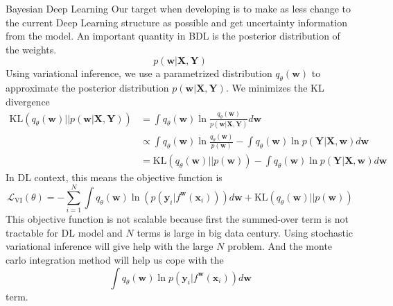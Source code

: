 \documentclass{beamer}
\begin{document}
\begin{frame}[allowframebreaks]{Bayesian Deep Learning}
Our target when developing is to make as less change to the current Deep Learning structure as possible and get uncertainty information from the model.
An important quantity in BDL is the posterior distribution of the weights.
$$p(\mathbf{w} | \mathbf{X}, \mathbf{Y})$$
Using variational inference, we use a parametrized distribution $q_\theta(\mathbf{w})$ to approximate the posterior distribution $p(\mathbf{w} | \mathbf{X}, \mathbf{Y})$.
We minimizes the KL divergence
\begin{align*}
\text{KL}(q_\theta(\mathbf{w}) || p(\mathbf{w} | \mathbf{X}, \mathbf{Y})) & = \int q_\theta(\mathbf{w}) \ln \frac{ q_\theta(\mathbf{w})}{p(\mathbf{w} | \mathbf{X}, \mathbf{Y})} d\mathbf{w} \\ 
& \propto \int q_\theta(\mathbf{w}) \ln \frac{ q_\theta(\mathbf{w})}{p(\mathbf{w})} - \int q_\theta(\mathbf{w}) \ln p(\mathbf{Y} | \mathbf{X}, \mathbf{w}) d\mathbf{w} \\ 
& = \text{KL}(q_\theta(\mathbf{w}) || p(\mathbf{w})) - \int q_\theta(\mathbf{w}) \ln p(\mathbf{Y} | \mathbf{X}, \mathbf{w}) d \mathbf{w}
\end{align*}
In DL context, this means the objective function is
$$\mathcal{L}_{\text{VI}} (\theta) = - \sum_{i=1}^N \int q_\theta(\mathbf{w}) \ln (p(\mathbf{y}_i | f^\mathbf{w} (\mathbf{x}_i))) d\mathbf{w} + \text{KL}(q_\theta(\mathbf{w}) || p(\mathbf{w}))$$
This objective function is not scalable because first the summed-over term is not tractable for DL model and $N$ terms is large in big data century. Using stochastic variational inference will give help with the large $N$ problem. And the monte carlo integration method will help us cope with the $$\int q_\theta(\mathbf{w}) \ln p(\mathbf{y}_i | f^\mathbf{w} (\mathbf{x}_i)) d\mathbf{w}$$ term.
\end{frame}
\end{document}
